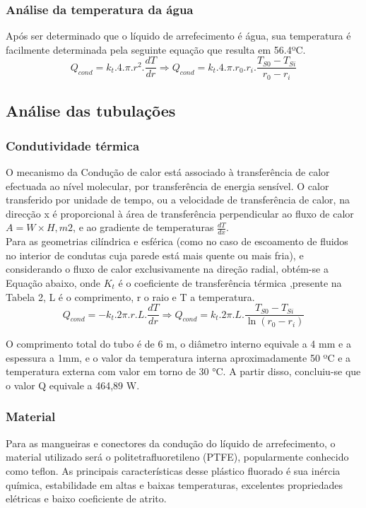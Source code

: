 \subsubsection{Análise da temperatura da água}
Após ser determinado que o líquido de arrefecimento é água, sua temperatura é facilmente determinada pela seguinte equação que resulta em 56.4ºC.
$$ Q_{cond} = k_{t}.4.\pi.r^2.\frac{dT}{dr} \Longrightarrow Q_{cond} = k_{t}.4.\pi.r_{0}.r_{i}.\frac{T_{S0}-T_{Si}}{r_{0}-r_{i}}$$


\subsection{Análise das tubulações}

\subsubsection{Condutividade térmica}
O mecanismo da Condução de calor está associado à transferência de calor efectuada ao nível molecular, por transferência de energia sensível. O calor transferido por unidade de tempo, ou a velocidade de transferência de calor, na direcção x é proporcional à área de transferência perpendicular ao fluxo de calor $A=W×H, m2$, e ao gradiente de temperaturas $\frac{dT}{dx}$.\\

Para as geometrias cilíndrica e esférica (como no caso de escoamento de fluidos no interior de condutas cuja parede está mais quente ou mais fria), e considerando o fluxo de calor exclusivamente na direção radial, obtém-se a Equação abaixo, onde $K_{t}$ é o coeficiente de transferência térmica ,presente na Tabela 2, L é o comprimento, r o raio e T a temperatura.
$$ Q_{cond} = -k_{t}.2\pi.r.L.\frac{dT}{dr} \Longrightarrow Q_{cond} = k_{t}.2\pi.L.\frac{T_{S0}-T_{Si}}{\ln (r_{0}-r_{i})}$$

O comprimento total do tubo é de 6 m, o diâmetro interno equivale a 4 mm e a espessura a 1mm, e o valor da temperatura interna aproximadamente 50 ºC e a temperatura externa com valor em torno de 30 °C. A partir disso, concluiu-se que o valor Q equivale a 464,89 W.

\subsubsection{Material}
Para as mangueiras e conectores da condução do líquido de arrefecimento, o material utilizado será o politetrafluoretileno (PTFE), popularmente conhecido como teflon. As principais características desse plástico fluorado é sua inércia química, estabilidade em altas e baixas temperaturas, excelentes propriedades elétricas e baixo coeficiente de atrito.\\

